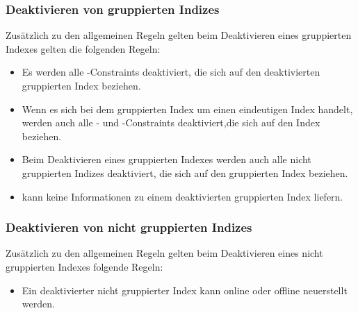         \subsubsection{Deaktivieren von gruppierten Indizes}
          Zusätzlich zu den allgemeinen Regeln gelten beim Deaktivieren eines
          gruppierten Indexes gelten die folgenden Regeln:
          \begin{itemize}
              \item Es werden alle \FOREIGNKEY-Constraints deaktiviert, die sich
              auf den deaktivierten gruppierten Index beziehen. 
              \item Wenn es sich bei dem gruppierten Index um einen
              eindeutigen Index handelt, werden auch alle \PRIMARYKEY- und
              \UNIQUE-Constraints deaktiviert,die sich auf den Index beziehen.
              \item Beim Deaktivieren eines gruppierten Indexes werden auch alle
              nicht gruppierten Indizes deaktiviert, die sich auf den
              gruppierten Index beziehen.
              \item {} kann keine Informationen zu
              einem deaktivierten gruppierten Index liefern.
          \end{itemize}
        \subsubsection{Deaktivieren von nicht gruppierten Indizes}
          Zusätzlich zu den allgemeinen Regeln gelten beim Deaktivieren eines
          nicht gruppierten Indexes folgende Regeln:
          \begin{itemize}
              \item Ein deaktivierter nicht gruppierter Index kann online oder
              offline neuerstellt werden.
          \end{itemize}
